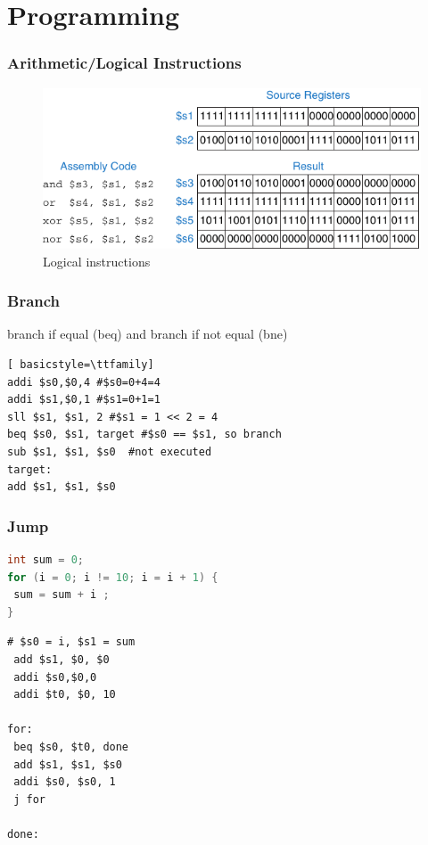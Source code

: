 \documentclass[xcolor={table, dvipsnames}]{beamer}
\begin{document}
\section{Programming}

\begin{frame}
\frametitle{Arithmetic/Logical Instructions}
\begin{figure}
 \includegraphics{img/logical-instructions.pdf}
 \caption{Logical instructions}
 \end{figure}
\end{frame}

\begin{frame}[fragile]
\frametitle{Branch}
branch if equal (beq) and branch if not equal (bne)

\begin{lstlisting}[ basicstyle=\ttfamily]
addi $s0,$0,4 #$s0=0+4=4
addi $s1,$0,1 #$s1=0+1=1
sll $s1, $s1, 2 #$s1 = 1 << 2 = 4
beq $s0, $s1, target #$s0 == $s1, so branch
sub $s1, $s1, $s0  #not executed 
target:
add $s1, $s1, $s0  
\end{lstlisting}
\end{frame}

\begin{frame}[fragile]
\frametitle{Jump}
  \begin{lstlisting}[language=C,  basicstyle=\ttfamily,keywordstyle=\color{blue}]     
int sum = 0;
for (i = 0; i != 10; i = i + 1) { 
 sum = sum + i ;
}
   \end{lstlisting} \pause

  \begin{lstlisting}[basicstyle=\ttfamily]     
# $s0 = i, $s1 = sum
 add $s1, $0, $0	    
 addi $s0,$0,0
 addi $t0, $0, 10
 
for:
 beq $s0, $t0, done
 add $s1, $s1, $s0
 addi $s0, $s0, 1
 j for
 
done:
   \end{lstlisting}
\end{frame}
\end{document}
